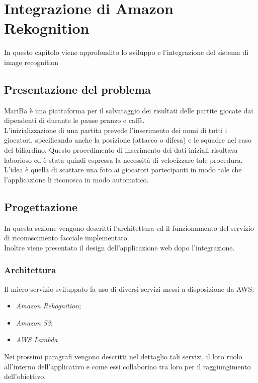 
\chapter{Integrazione di Amazon Rekognition}
\label{cap:rekognition}

In questo capitolo viene approfondito lo sviluppo e l'integrazione del sistema di image recognition\\


\section{Presentazione del problema}
MariBa è una piattaforma per il salvataggio dei risultati delle partite giocate dai dipendenti di \azienda durante le 
pause pranzo e caffè. \\
L'inizializzazione di una partita prevede l'inserimento dei nomi di tutti i giocatori, specificando anche la posizione (attacco o difesa) e le squadre nel caso del biliardino. Questo procedimento di inserimento dei dati iniziali
risultava laborioso ed è stata quindi espressa la necessità di velocizzare tale procedura. \\
L'idea è quella di scattare una foto ai giocatori partecipanti in modo tale che l'applicazione li riconosca in modo automatico.

\section{Progettazione}
In questa sezione vengono descritti l'architettura ed il funzionamento del servizio di riconoscimento facciale implementato. \\
Inoltre viene presentato il design dell'applicazione web dopo l'integrazione.

	\subsection{Architettura}
	 Il micro-servizio sviluppato fa uso di diversi servizi messi a disposizione da \gls{AWS}: 
	 \begin{itemize}
	 	\item \emph{Amazon Rekognition};
	 	\item \emph{Amazon S3};
	 	\item \emph{AWS Lambda}
	 \end{itemize}
 	Nei prossimi paragrafi vengono descritti nel dettaglio tali servizi, il loro ruolo all'interno dell'applicativo e come essi collaborino tra loro per il raggiungimento dell'obiettivo.
	
